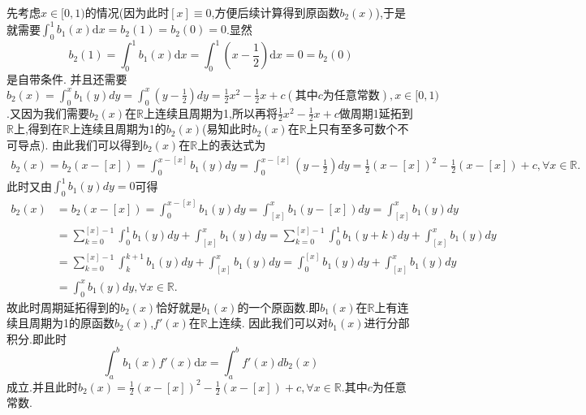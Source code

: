 \documentclass[../../main.tex]{subfiles}
\begin{document}
\begin{remark}
先考虑$x\in [0,1)$的情况(因为此时$[x]\equiv0$,方便后续计算得到原函数$b_2(x)$),于是就需要\(\int_0^1{b_1(x)\mathrm{d}x}=b_2\left( 1 \right) =b_2\left( 0 \right) =0\).显然
\[
b_2(1)=\int_{0}^{1}b_1(x)\mathrm{d}x=\int_{0}^{1}\left(x-\frac{1}{2}\right)\mathrm{d}x = 0 =b_2(0)
\]
是自带条件.
并且还需要\(b_2(x)=\int_0^x{b_1\left( y \right) dy}=\int_0^x{\left( y-\frac{1}{2} \right) dy}=\frac{1}{2}x^2-\frac{1}{2}x + c(\text{其中}c\text{为任意常数}),x\in[0,1)\).又因为我们需要$b_2(x)$在$\mathbb{R}$上连续且周期为1,所以再将$\frac{1}{2}x^2-\frac{1}{2}x + c$做周期1延拓到$\mathbb{R}$上,得到在$\mathbb{R}$上连续且周期为1的$b_2(x)$(易知此时$b_2(x)$在$\mathbb{R}$上只有至多可数个不可导点).
由此我们可以得到$b_2(x)$在$\mathbb{R}$上的表达式为
\begin{align*}
b_2\left( x \right) =b_2\left( x-\left[ x \right] \right) =\int_0^{x-\left[ x \right]}{b_1\left( y \right) dy}=\int_0^{x-\left[ x \right]}{\left( y-\frac{1}{2} \right) dy}=\frac{1}{2}\left( x-\left[ x \right] \right) ^2-\frac{1}{2}\left( x-\left[ x \right] \right) +c,\forall x\in \mathbb{R} .
\end{align*}
此时又由$\int_0^1{b_1\left( y \right) dy}=0$可得
\begin{align*}
b_2\left( x \right) &=b_2\left( x-\left[ x \right] \right) =\int_0^{x-\left[ x \right]}{b_1\left( y \right) dy}=\int_{\left[ x \right]}^x{b_1\left( y-\left[ x \right] \right) dy}=\int_{\left[ x \right]}^x{b_1\left( y \right) dy}
\\
&=\sum_{k=0}^{\left[ x \right] -1}{\int_0^1{b_1\left( y \right) dy}}+\int_{\left[ x \right]}^x{b_1\left( y \right) dy}=\sum_{k=0}^{\left[ x \right] -1}{\int_0^1{b_1\left( y+k \right) dy}}+\int_{\left[ x \right]}^x{b_1\left( y \right) dy}
\\
&=\sum_{k=0}^{\left[ x \right] -1}{\int_k^{k+1}{b_1\left( y \right) dy}}+\int_{\left[ x \right]}^x{b_1\left( y \right) dy}=\int_0^{\left[ x \right]}{b_1\left( y \right) dy}+\int_{\left[ x \right]}^x{b_1\left( y \right) dy}
\\
&=\int_0^x{b_1\left( y \right) dy},\forall x\in \mathbb{R}.
\end{align*}
故此时周期延拓得到的$b_2(x)$恰好就是$b_1(x)$的一个原函数.即$b_1(x)$在$\mathbb{R}$上有连续且周期为1的原函数$b_2(x)$,$f'(x)$在$\mathbb{R}$上连续.
因此我们可以对$b_1(x)$进行分部积分.即此时
\[
\int_{a}^{b}b_1(x)f'(x)\mathrm{d}x=\int_{a}^{b}f'(x)db_2(x)
\]
成立.并且此时$ b_2\left( x \right)=\frac{1}{2}\left( x-\left[ x \right] \right) ^2-\frac{1}{2}\left( x-\left[ x \right] \right) +c,\forall x\in \mathbb{R}$.其中$c$为任意常数.


\end{remark}
\end{document}
